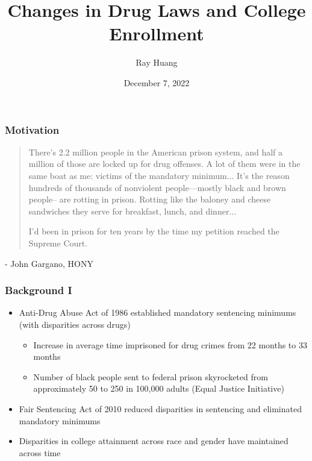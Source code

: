 \documentclass{beamer}
\title{Changes in Drug Laws and College Enrollment}
\author{Ray Huang}
\institute{Senior Thesis}
\date{December 7, 2022}
\begin{document}
\frame{\titlepage}


\begin{frame}
\frametitle{Motivation}
\begin{quote}
  There’s 2.2 million people in the American prison system, and half a million of those are locked up for drug offenses. A lot of them were in the same boat as me: victims of the mandatory minimum... It’s the reason hundreds of thousands of nonviolent people—mostly black and brown people-- are rotting in prison. Rotting like the baloney and cheese sandwiches they serve for breakfast, lunch, and dinner...

  I’d been in prison for ten years by the time my petition reached the Supreme Court.
\end{quote}
\hspace*{\fill} - John Gargano, HONY
\end{frame}


\begin{frame}
\frametitle{Background I}
\begin{itemize}
    \item Anti-Drug Abuse Act of 1986 established mandatory sentencing minimums (with disparities across drugs)
    \begin{itemize}
        \item Increase in average time imprisoned for drug crimes from 22 months to 33 months
        \item Number of black people sent to federal prison skyrocketed from approximately 50 to 250 in 100,000 adults (Equal Justice Initiative)
    \end{itemize}
    \item Fair Sentencing Act of 2010 reduced disparities in sentencing and eliminated mandatory minimums
    \item Disparities in college attainment across race and gender have maintained across time
\end{itemize}
\end{frame}

\end{document}
